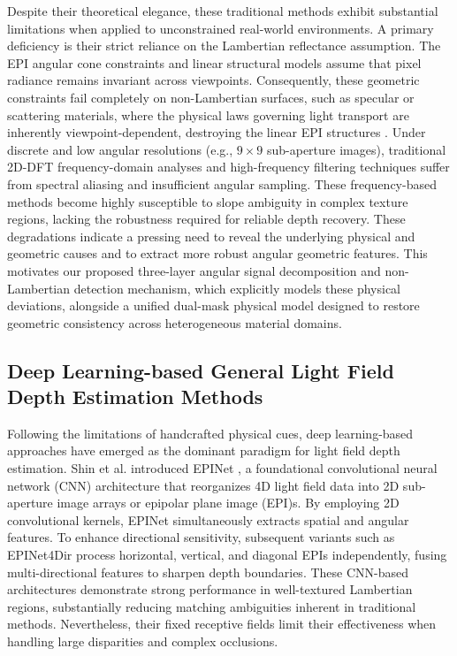 \documentclass[lettersize,journal]{IEEEtran}
\begin{document}
Despite their theoretical elegance, these traditional methods exhibit substantial limitations when applied to unconstrained real-world environments. A primary deficiency is their strict reliance on the Lambertian reflectance assumption. The EPI angular cone constraints and linear structural models assume that pixel radiance remains invariant across viewpoints. Consequently, these geometric constraints fail completely on non-Lambertian surfaces, such as specular or scattering materials, where the physical laws governing light transport are inherently viewpoint-dependent, destroying the linear EPI structures . Under discrete and low angular resolutions (e.g., $9 \times 9$ sub-aperture images), traditional 2D-DFT frequency-domain analyses and high-frequency filtering techniques suffer from spectral aliasing and insufficient angular sampling. These frequency-based methods become highly susceptible to slope ambiguity in complex texture regions, lacking the robustness required for reliable depth recovery. These degradations indicate a pressing need to reveal the underlying physical and geometric causes and to extract more robust angular geometric features. This motivates our proposed three-layer angular signal decomposition and non-Lambertian detection mechanism, which explicitly models these physical deviations, alongside a unified dual-mask physical model designed to restore geometric consistency across heterogeneous material domains.

\subsection{Deep Learning-based General Light Field Depth Estimation Methods}

Following the limitations of handcrafted physical cues, deep learning-based approaches have emerged as the dominant paradigm for light field depth estimation. Shin et al. introduced EPINet , a foundational convolutional neural network (CNN) architecture that reorganizes 4D light field data into 2D sub-aperture image arrays or epipolar plane image (EPI)s. By employing 2D convolutional kernels, EPINet simultaneously extracts spatial and angular features. To enhance directional sensitivity, subsequent variants such as EPINet4Dir  process horizontal, vertical, and diagonal EPIs independently, fusing multi-directional features to sharpen depth boundaries. These CNN-based architectures demonstrate strong performance in well-textured Lambertian regions, substantially reducing matching ambiguities inherent in traditional methods. Nevertheless, their fixed receptive fields limit their effectiveness when handling large disparities and complex occlusions.
\end{document}
